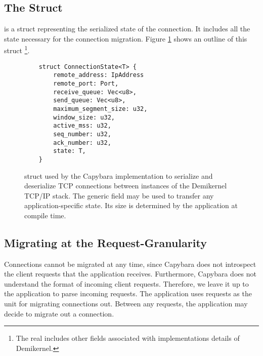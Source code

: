 \subsection{The  Struct}
 is a struct representing the serialized state of the connection. It includes all the state necessary for the connection migration. Figure \ref{fig:tcp-connection-state} shows an outline of this struct \footnote{The real  includes other fields associated with implementations details of Demikernel.}.

\begin{figure}[hbtp]
    \begin{lstlisting}
    struct ConnectionState<T> {
        remote_address: IpAddress
        remote_port: Port,
        receive_queue: Vec<u8>,
        send_queue: Vec<u8>,
        maximum_segment_size: u32,
        window_size: u32,
        active_mss: u32,
        seq_number: u32,
        ack_number: u32,
        state: T,
    }
    \end{lstlisting}
    \caption{ struct used by the Capybara implementation to serialize and deserialize TCP connections between instances of the Demikernel TCP/IP stack. The generic field  may be used to transfer any application-specific state. Its size is determined by the application at compile time.}
    \label{fig:tcp-connection-state}
\end{figure}

\subsection{Migrating at the Request-Granularity}
Connections cannot be migrated at any time, since Capybara does not introspect the client requests that the application receives. Furthermore, Capybara does not understand the format of incoming client requests. Therefore, we leave it up to the application to parse incoming requests. The application uses requests as the unit for migrating connections out. Between any requests, the application may decide to migrate out a connection.

